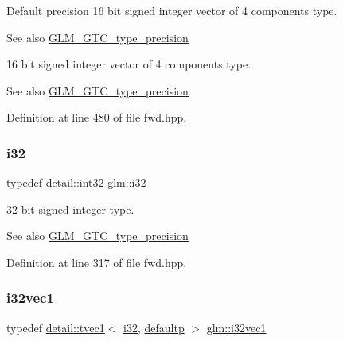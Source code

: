 Default precision 16 bit signed integer vector of 4 components type. \begin{DoxySeeAlso}{See also}
\hyperlink{group__gtc__type__precision}{G\+L\+M\+\_\+\+G\+T\+C\+\_\+type\+\_\+precision}
\end{DoxySeeAlso}
16 bit signed integer vector of 4 components type. \begin{DoxySeeAlso}{See also}
\hyperlink{group__gtc__type__precision}{G\+L\+M\+\_\+\+G\+T\+C\+\_\+type\+\_\+precision} 
\end{DoxySeeAlso}


Definition at line 480 of file fwd.\+hpp.

\mbox{\label{group__gtc__type__precision_ga1d8ed5c43e91ea7d4528389da4fa9524}} 
\subsubsection{\texorpdfstring{i32}{i32}}
{\footnotesize\ttfamily typedef \hyperlink{namespaceglm_1_1detail_a9f85b4efeca416cdcec2fd08939a2e17}{detail\+::int32} \hyperlink{group__gtc__type__precision_ga1d8ed5c43e91ea7d4528389da4fa9524}{glm\+::i32}}

32 bit signed integer type. \begin{DoxySeeAlso}{See also}
\hyperlink{group__gtc__type__precision}{G\+L\+M\+\_\+\+G\+T\+C\+\_\+type\+\_\+precision} 
\end{DoxySeeAlso}


Definition at line 317 of file fwd.\+hpp.

\mbox{\label{group__gtc__type__precision_ga0d3741d44591183f3dee9500b4ad9ab4}} 
\subsubsection{\texorpdfstring{i32vec1}{i32vec1}}
{\footnotesize\ttfamily typedef \hyperlink{structglm_1_1detail_1_1tvec1}{detail\+::tvec1}$<$ \hyperlink{group__gtc__type__precision_ga1d8ed5c43e91ea7d4528389da4fa9524}{i32}, \hyperlink{namespaceglm_a0f04f086094c747d227af4425893f545a9d21ccd8b5a009ec7eb7677befc3bf51}{defaultp} $>$ \hyperlink{group__gtc__type__precision_ga0d3741d44591183f3dee9500b4ad9ab4}{glm\+::i32vec1}}

